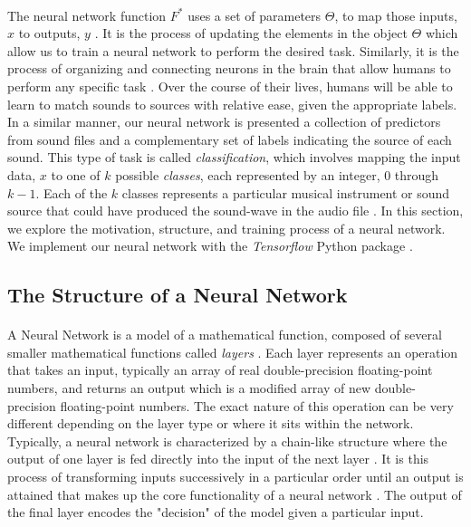 \documentclass[12pt,letterpaper]{article}
\begin{document}
\paragraph*{}The neural network function $F^*$ uses a set of parameters $\Theta$, to map those inputs, $x$ to outputs, $y$ \cite{Goodfellow,James,Virtanen}. It is the process of updating the elements in the object $\Theta$ which allow us to train a neural network to perform the desired task. Similarly, it is the process of organizing and connecting neurons in the brain that allow humans to perform any specific task \cite{Geron,Levine}. Over the course of their lives, humans will be able to learn to match sounds to sources with relative ease, given the appropriate labels. In a similar manner, our neural network is presented a collection of predictors from sound files and a complementary set of labels indicating the source of each sound. This type of task is called \textit{classification}, which involves mapping the input data, $x$ to one of $k$ possible \textit{classes}, each represented by an integer, $0$ through $k-1$. Each of the $k$ classes represents a particular musical instrument or sound source that could have produced the sound-wave in the audio file \cite{Goodfellow,Loy,Virtanen}. In this section, we explore the motivation, structure, and training process of a neural network. We implement our neural network with the \textit{Tensorflow} Python package \cite{Tensorflow}.


\subsection{The Structure of a Neural Network}
\label{subsec-NetworkStructure}

\paragraph*{}A Neural Network is a model of a mathematical function, composed of several smaller mathematical functions called \textit{layers} \cite{Goodfellow,Loy}. Each layer represents an operation that takes an input, typically an array of real double-precision floating-point numbers, and returns an output which is a modified array of new double-precision floating-point numbers. The exact nature of this operation can be very different depending on the layer type or where it sits within the network. Typically, a neural network is characterized by a chain-like structure where the output of one layer is fed directly into the input of the next layer \cite{Geron,Goodfellow}. It is this process of transforming inputs successively in a particular order until an output is attained that makes up the core functionality of a neural network \cite{Geron,Loy}. The output of the final layer encodes the "decision" of the model given a particular input.
\end{document}
